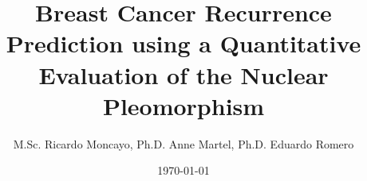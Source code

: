 \documentclass[usenames,dvipsnames]{beamer}
\author{M.Sc. Ricardo Moncayo, Ph.D. Anne Martel, Ph.D. Eduardo Romero}
\title{Breast Cancer Recurrence Prediction using a Quantitative Evaluation of the Nuclear Pleomorphism}
\institute{Department of \\
Electrical Engineering}
\date{\today}
\begin{document}
\begin{frame}[plain]
\maketitle
\small
{\centering\itshape \par}
\par\medskip

\end{frame}


	 


  
  
  
\end{document}
